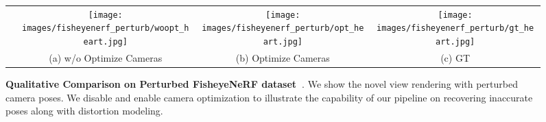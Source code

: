 {\begin{figure*}[th]
\begin{tabular}{cccc}
                
        \raisebox{0.9\height}{\hspace{-0.5cm}\rotatebox{90}{{Flowers}}} &
        
        \texttt{[image: images/fisheyenerf\_perturb/woopt\_heart.jpg]} &
        \texttt{[image: images/fisheyenerf\_perturb/opt\_heart.jpg]} &
        \texttt{[image: images/fisheyenerf\_perturb/gt\_heart.jpg]} \\
        \multicolumn{1}{c}{} & \multicolumn{1}{c}{(a) w/o Optimize Cameras} & \multicolumn{1}{c}{(b) Optimize Cameras}& \multicolumn{1}{c}{(c) GT}
        \\
    \end{tabular}

    \caption{\textbf{Qualitative Comparison on Perturbed FisheyeNeRF dataset~\cite{jeong2021self}}. We show the novel view rendering with perturbed camera poses. We disable and enable camera optimization to illustrate the capability of our pipeline on recovering inaccurate poses along with distortion modeling.}
    \label{fig:fisheyenerf_Perturb}

\end{figure*}
}